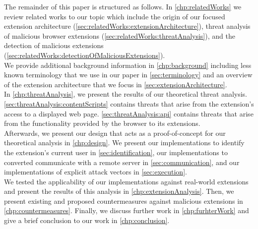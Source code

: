 	The remainder of this paper is structured as follows. In \autoref{chp:relatedWorks} we review related works to our topic which include the origin of our focused extension architecture (\autoref{sec:relatedWorks:extensionArchitecture}), threat analysis of malicious browser extensions (\autoref{sec:relatedWorks:threatAnalysis}), and the detection of malicious extensions (\autoref{sec:relatedWorks:detectionOfMaliciousExtensions}). \\
	We provide additional background information in \autoref{chp:background} including less known terminology that we use in our paper in \autoref{sec:terminology} and an overview of the extension architecture that we focus in \autoref{sec:extensionArchitecture}. \\
	In \autoref{chp:threatAnalysis}, we present the results of our theoretical threat analysis. \autoref{sec:threatAnalysis:contentScripts} contains threats that arise from the extension's access to a displayed web page. \autoref{sec:threatAnalysis:api} contains threats that arise from the functionality provided by the browser to its extensions. \\
	Afterwards, we present our design that acts as a proof-of-concept for our theoretical analysis in \autoref{chp:design}. We present our implementations to identify the extension's current user in \autoref{sec:identification}, our implementations to converted communicate with a remote server in \autoref{sec:communication}, and our implementations of explicit attack vectors in \autoref{sec:execution}. \\
	We tested the applicability of our implementations against real-world extensions and present the results of this analysis in \autoref{chp:extensionAnalysis}.
	Then, we present existing and proposed countermeasures against malicious extensions in \autoref{chp:countermeasures}.
	Finally, we discuss further work in \autoref{chp:furhterWork} and give a brief conclusion to our work in \autoref{chp:conclusion}.
	